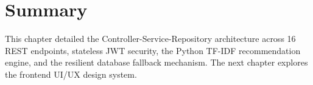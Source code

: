 \section{Summary}
This chapter detailed the Controller-Service-Repository architecture across 16 REST endpoints, stateless JWT security, the Python TF-IDF recommendation engine, and the resilient database fallback mechanism. The next chapter explores the frontend UI/UX design system.
